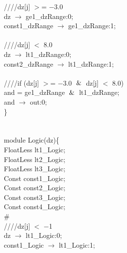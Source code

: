 \hspace*{2em}////dz[j] $>$= $-$3.0 \\
\hspace*{2em}dz $\rightarrow$ ge1\_dzRange:0; \\
\hspace*{2em}const1\_dzRange $\rightarrow$ ge1\_dzRange:1; \\
   \\
   \hspace*{2em}////dz[j] $<$ 8.0 \\
   \hspace*{2em}dz $\rightarrow$ lt1\_dzRange:0; \\
   \hspace*{2em}const2\_dzRange $\rightarrow$ lt1\_dzRange:1; \\
   \\
   \hspace*{2em}////if (dz[j] $>$= $-$3.0 $\And$ dz[j] $<$ 8.0) \\
   \hspace*{2em} and = ge1\_dzRange $\And$ lt1\_dzRange; \\
   \hspace*{2em}and $\rightarrow$ out:0; \\
\} \\
\\
\\
module Logic(dz)\{ \\
\hspace*{2em}FloatLess lt1\_Logic; \\
\hspace*{2em}FloatLess lt2\_Logic; \\
\hspace*{2em}FloatLess lt3\_Logic; \\
\hspace*{2em}Const const1\_Logic; \\
\hspace*{2em}Const const2\_Logic; \\
\hspace*{2em}Const const3\_Logic; \\
\hspace*{2em}Const const4\_Logic; \\
\# \\
\hspace*{2em}////dz[j] $<$ $-$1 \\
\hspace*{2em}dz $\rightarrow$ lt1\_Logic:0; \\
\hspace*{2em}const1\_Logic $\rightarrow$ lt1\_Logic:1; \\
